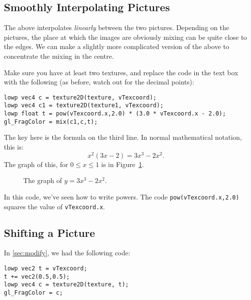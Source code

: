 \documentclass[
  html5,%
  mathml,%
  use filename%
]{internet}
\let\origtikzsetnextfilename\tikzsetnextfilename
\def\tikzsetnextfilename#1{%
  \origtikzsetnextfilename{#1}
  \mysetlabel{#1}
}
\newcommand{\mysetlabel}[1]{%
  \gdef\mynextlabel{#1}}
\newcommand{\autolabel}{%
  \label{fig:\mynextlabel}
  \global\let\mynextlabel\relax
}
\begin{document}
\subsection{Smoothly Interpolating Pictures}
\label{task:interpolating}

The above interpolates \emph{linearly} between the two pictures.
Depending on the pictures, the place at which the images are obviously mixing can be quite close to the edges.
We can make a slightly more complicated version of the above to concentrate the mixing in the centre.

Make sure you have at least two textures, and replace the code in the text box with the following (as before, watch out for the decimal points):

\begin{tcolorbox}
\begin{verbatim}
lowp vec4 c = texture2D(texture, vTexcoord);
lowp vec4 c1 = texture2D(texture1, vTexcoord);
lowp float t = pow(vTexcoord.x,2.0) * (3.0 * vTexcoord.x - 2.0);
gl_FragColor = mix(c1,c,t);
\end{verbatim}
\end{tcolorbox}

The key here is the formula on the third line.
In normal mathematical notation, this is:
%
\[
  x^2 (3 x - 2) = 3 x^3 - 2 x^2.
  \]
%
The graph of this, for \(0 \le x \le 1\) is in Figure~\ref{fig:smoothstep}.

\begin{figure}
\centering
{}
\caption{The graph of \(y = 3 x^3 - 2 x^2\).}
\autolabel
\end{figure}

In this code, we've seen how to write powers.
The code \verb!pow(vTexcoord.x,2.0)! squares the value of \verb!vTexcoord.x!.

\subsection{Shifting a Picture}

In \ref{sec:modify}, we had the following code:

\begin{tcolorbox}
\begin{verbatim}
lowp vec2 t = vTexcoord;
t += vec2(0.5,0.5);
lowp vec4 c = texture2D(texture, t);
gl_FragColor = c;
\end{verbatim}
\end{tcolorbox}
\end{document}
